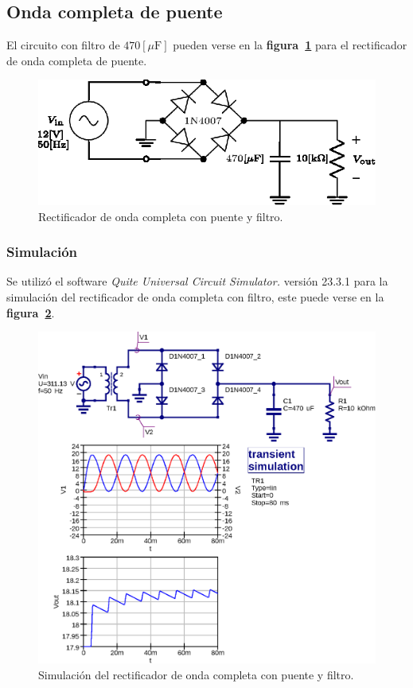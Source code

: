 \subsection{Onda completa de puente}
El circuito con filtro de $470[\mu\text{F}]$ pueden verse en la
\textbf{figura~\ref{circuito07}} para el rectificador de onda completa de
puente.

\begin{figure}[!h]
\centering
\includegraphics[scale=1.1]{diagramas/07.onda_completa2.eps}
\caption{Rectificador de onda completa con puente y filtro.}
\label{circuito07}
\end{figure}

\subsubsection{Simulación}
Se utilizó el software \emph{Quite Universal Circuit Simulator.} versión 23.3.1
para la simulación del rectificador de onda completa con filtro, este puede
verse en la \textbf{figura~\ref{simulacion07}}.

\begin{figure}[!h]
\centering
\includegraphics[scale=0.75]{simulacion/07.onda_completa2.eps}
\caption{Simulación del rectificador de onda completa con puente y filtro.}
\label{simulacion07}
\end{figure}

